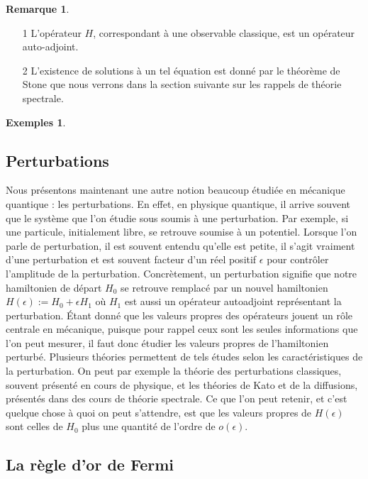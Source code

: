 \documentclass[12pt,openany,a4paper, titlepage]{article}
\theoremstyle{definition}
\theoremstyle{definition}
\theoremstyle{definition}
\theoremstyle{definition}
\newtheorem{exs}{Exemples}
\theoremstyle{definition}
\newtheorem{rem}{Remarque}
\theoremstyle{definition}
\begin{document}
\begin{rem}
    \begin{enumerate}
        \item[1] L'opérateur $H$, correspondant à une observable classique, est un opérateur auto-adjoint.
        \item[2] L'existence de solutions à un tel équation est donné par le théorème de Stone que nous verrons dans la section suivante sur les rappels de théorie spectrale.
    \end{enumerate}
\end{rem}

\begin{exs}
    
\end{exs}

\subsection{Perturbations}

Nous présentons maintenant une autre notion beaucoup étudiée en mécanique quantique : les perturbations.
En effet, en physique quantique, il arrive souvent que le système que l'on étudie sous soumis à une perturbation. Par exemple, si une particule, initialement libre, se retrouve soumise à un potentiel. Lorsque l'on parle de perturbation, il est souvent entendu qu'elle est petite, il s'agit vraiment d'une perturbation et est souvent facteur d'un réel positif $\epsilon$ pour contrôler l'amplitude de la perturbation.
Concrètement, un perturbation signifie que notre hamiltonien de départ $H_0$ se retrouve remplacé par un nouvel hamiltonien $H(\epsilon) := H_0 + \epsilon H_1$ où $H_1$ est aussi un opérateur autoadjoint représentant la perturbation. Étant donné que les valeurs propres des opérateurs jouent un rôle centrale en mécanique, puisque pour rappel ceux sont les seules informations que l'on peut mesurer, il faut donc étudier les valeurs propres de l'hamiltonien perturbé. Plusieurs théories permettent de tels études selon les caractéristiques de la perturbation. On peut par exemple la théorie des perturbations classiques, souvent présenté en cours de physique, et les théories de Kato et de la diffusions, présentés dans des cours de théorie spectrale. Ce que l'on peut retenir, et c'est quelque chose à quoi on peut s'attendre, est que les valeurs propres de $H(\epsilon)$ sont celles de $H_0$ plus une quantité de l'ordre de $o(\epsilon)$. 


\subsection{La règle d'or de Fermi} 
\end{document}
